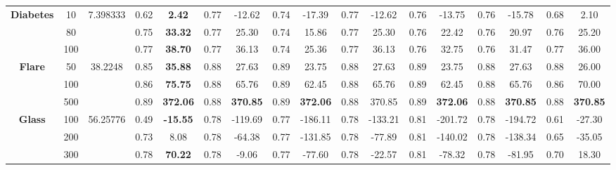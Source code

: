 \documentclass[letterpaper]{article}
\theoremstyle{definition}
\begin{document}
\begin{table}[h]
\begin{tabular}{|c|c|c|c|c|c|c|c|c|c|c|c|c|c|c|c|c|}
\multirow{3}{*}{\textbf{Diabetes}}  & 10       & 7.398333 & 0.62  & \textbf{2.42}    & 0.77  & -12.62           & 0.74   & -17.39            & 0.77      & -12.62       & 0.76  & -13.75           & 0.76     & -15.78             & 0.68   & 2.10             \\ \cline{2-17} 
                                    & 80       &          & 0.75  & \textbf{33.32}   & 0.77  & 25.30            & 0.74   & 15.86             & 0.77      & 25.30        & 0.76  & 22.42            & 0.76     & 20.97              & 0.76   & 25.20            \\ \cline{2-17} 
                                    & 100      &          & 0.77  & \textbf{38.70}   & 0.77  & 36.13            & 0.74   & 25.36             & 0.77      & 36.13        & 0.76  & 32.75            & 0.76     & 31.47              & 0.77   & 36.00            \\ \hline
\multirow{3}{*}{\textbf{Flare}}     & 50       & 38.2248  & 0.85  & \textbf{35.88}   & 0.88  & 27.63            & 0.89   & 23.75             & 0.88      & 27.63        & 0.89  & 23.75            & 0.88     & 27.63              & 0.88   & 26.00            \\ \cline{2-17} 
                                    & 100      &          & 0.86  & \textbf{75.75}   & 0.88  & 65.76            & 0.89   & 62.45             & 0.88      & 65.76        & 0.89  & 62.45            & 0.88     & 65.76              & 0.86   & 70.00            \\ \cline{2-17} 
                                    & 500      &          & 0.89  & \textbf{372.06}  & 0.88  & \textbf{370.85}  & 0.89   & \textbf{372.06}   & 0.88      & 370.85       & 0.89  & \textbf{372.06}  & 0.88     & \textbf{370.85}    & 0.88   & \textbf{370.85}  \\ \hline
\multirow{3}{*}{\textbf{Glass}}     & 100      & 56.25776 & 0.49  & \textbf{-15.55}  & 0.78  & -119.69          & 0.77   & -186.11           & 0.78      & -133.21      & 0.81  & -201.72          & 0.78     & -194.72            & 0.61   & -27.30           \\ \cline{2-17} 
                                    & 200      &          & 0.73  & 8.08             & 0.78  & -64.38           & 0.77   & -131.85           & 0.78      & -77.89       & 0.81  & -140.02          & 0.78     & -138.34            & 0.65   & -35.05           \\ \cline{2-17} 
                                    & 300      &          & 0.78  & \textbf{70.22}   & 0.78  & -9.06            & 0.77   & -77.60            & 0.78      & -22.57       & 0.81  & -78.32           & 0.78     & -81.95             & 0.70   & 18.30            \\ \hline

\end{tabular}
\end{table}
\end{document}
